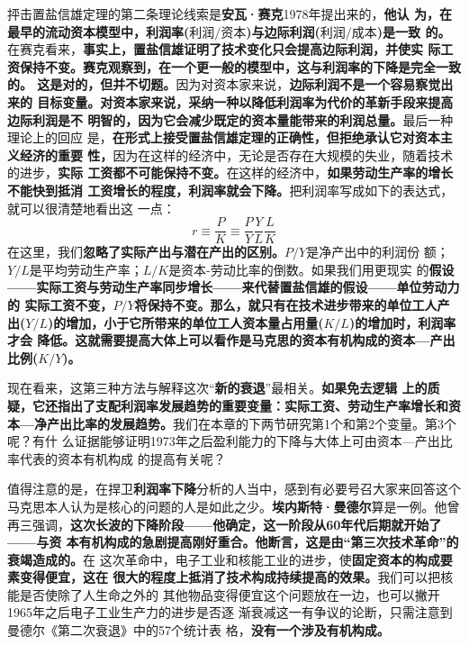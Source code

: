 抨击置盐信雄定理的第二条理论线索是\textbf{安瓦·赛克}1978年提出来的，\textbf{他认
  为，在最早的流动资本模型中，利润率($利润/资本$)与边际利润($利润/成本$)是一致
  的。}在赛克看来，\textbf{事实上，置盐信雄证明了技术变化只会提高边际利润，并使实
  际工资保持不变。赛克观察到，在一个更一般的模型中，这与利润率的下降是完全一致的。
  这是对的，但并不切题。}因为对资本家来说，\textbf{边际利润不是一个容易察觉出来的
  目标变量。对资本家来说，采纳一种以降低利润率为代价的革新手段来提高边际利润是不
  明智的，因为它会减少既定的资本量能带来的利润总量。}最后一种理论上的回应
是，\textbf{在形式上接受置盐信雄定理的正确性，但拒绝承认它对资本主义经济的重要
  性，}因为在这样的经济中，无论是否存在大规模的失业，随着技术的进步，\textbf{实际
  工资都不可能保持不变。}在这样的经济中，\textbf{如果劳动生产率的增长不能快到抵消
  工资增长的程度，利润率就会下降。}把利润率写成如下的表达式，就可以很清楚地看出这
一点：
\begin{equation}
  \label{eq:weiji2}
  r \equiv \frac{P}{K} \equiv \frac{P}{Y} \frac{Y}{L} \frac{L}{K}
\end{equation}
在这里，我们\textbf{忽略了实际产出与潜在产出的区别。}$P / Y$是净产出中的利润份
额；$Y/ L$是平均劳动生产率；$L /K$是资本-劳动比率的倒数。如果我们用更现实
的\textbf{假设——实际工资与劳动生产率同步增长——来代替置盐信雄的假设——单位劳动力的
  实际工资不变，$P /Y$将保持不变。那么，就只有在技术进步带来的单位工人产
  出($Y/L$)的增加，小于它所带来的单位工人资本量占用量($K /L$)的增加时，利润率才会
  降低。这就需要提高大体上可以看作是马克思的资本有机构成的资本—产出比例($K /Y$)。}

现在看来，这第三种方法与解释这次“\textbf{新的衰退}”最相关。\textbf{如果免去逻辑
  上的质疑，它还指出了支配利润率发展趋势的重要变量：实际工资、劳动生产率增长和资
  本—净产出比率的发展趋势。}我们在本章的下两节研究第1个和第2个变量。第3个呢？有什
么证据能够证明1973年之后盈利能力的下降与大体上可由资本—产出比率代表的资本有机构成
的提高有关呢？

值得注意的是，在捍卫\textbf{利润率下降}分析的人当中，感到有必要号召大家来回答这个
马克思本人认为是核心的问题的人是如此之少。\textbf{埃内斯特·曼德尔}算是一例。他曾
再三强调，\textbf{这次长波的下降阶段——他确定，这一阶段从60年代后期就开始了——与资
  本有机构成的急剧提高刚好重合。他断言，这是由“第三次技术革命”的衰竭造成的。}在
这次革命中，电子工业和核能工业的进步，使\textbf{固定资本的构成要素变得便宜，这在
  很大的程度上抵消了技术构成持续提高的效果。}我们可以把核能是否使除了人生命之外的
其他物品变得便宜这个问题放在一边，也可以撇开1965年之后电子工业生产力的进步是否逐
渐衰减这一有争议的论断，只需注意到曼德尔《第二次衰退》中的57个统计表
格，\textbf{没有一个涉及有机构成。}

